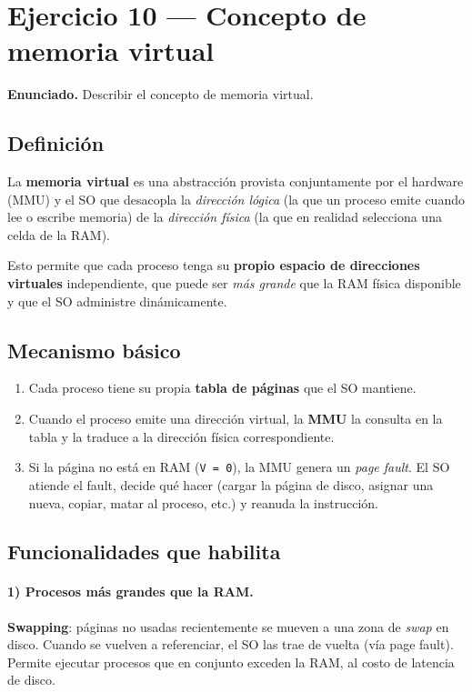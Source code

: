 \documentclass[11pt,a4paper]{article}
\begin{document}
\section{Ejercicio 10 --- Concepto de memoria virtual}

\textbf{Enunciado.} Describir el concepto de memoria virtual.

\subsection*{Definición}

La \textbf{memoria virtual} es una abstracción provista
conjuntamente por el hardware (MMU) y el SO que desacopla la
\emph{dirección lógica} (la que un proceso emite cuando lee o
escribe memoria) de la \emph{dirección física} (la que en realidad
selecciona una celda de la RAM).

Esto permite que cada proceso tenga su \textbf{propio espacio de
direcciones virtuales} independiente, que puede ser \emph{más
grande} que la RAM física disponible y que el SO administre
dinámicamente.

\subsection*{Mecanismo básico}

\begin{enumerate}[leftmargin=*,nosep]
    \item Cada proceso tiene su propia \textbf{tabla de páginas}
        que el SO mantiene.
    \item Cuando el proceso emite una dirección virtual, la
        \textbf{MMU} la consulta en la tabla y la traduce a la
        dirección física correspondiente.
    \item Si la página no está en RAM (\texttt{V = 0}), la MMU
        genera un \emph{page fault}. El SO atiende el fault, decide
        qué hacer (cargar la página de disco, asignar una nueva,
        copiar, matar al proceso, etc.) y reanuda la instrucción.
\end{enumerate}

\subsection*{Funcionalidades que habilita}

\paragraph{1) Procesos más grandes que la RAM.}
\textbf{Swapping}: páginas no usadas recientemente se mueven a una
zona de \emph{swap} en disco. Cuando se vuelven a referenciar, el
SO las trae de vuelta (vía page fault). Permite ejecutar procesos
que en conjunto exceden la RAM, al costo de latencia de disco.
\end{document}
